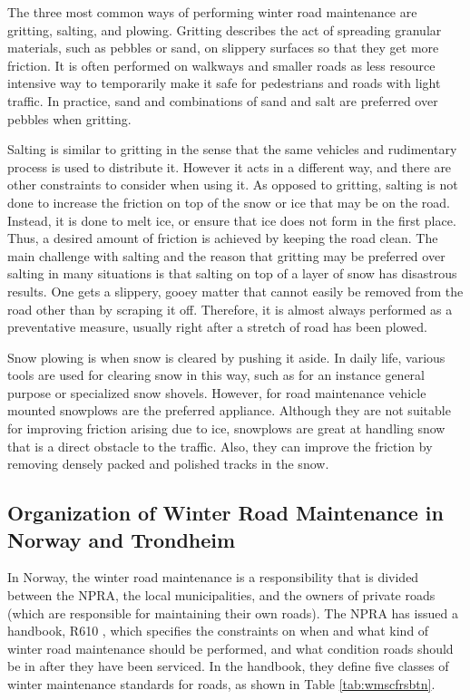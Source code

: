 The three most common ways of performing winter road maintenance are gritting, salting, and plowing. Gritting describes the act of spreading granular materials, such as pebbles or sand, on slippery surfaces so that they get more friction. It is often performed on walkways and smaller roads as less resource intensive way to temporarily make it safe for pedestrians and roads with light traffic. In practice, sand and combinations of sand and salt are preferred over pebbles when gritting.

Salting is similar to gritting in the sense that the same vehicles and rudimentary process is used to distribute it. However it acts in a different way, and there are other constraints to consider when using it. As opposed to gritting, salting is not done to increase the friction on top of the snow or ice that may be on the road. Instead, it is done to melt ice, or ensure that ice does not form in the first place. Thus, a desired amount of friction is achieved by keeping the road clean. The main challenge with salting and the reason that gritting may be preferred over salting in many situations is that salting on top of a layer of snow has disastrous results. One gets a slippery, gooey matter that cannot easily be removed from the road other than by scraping it off. Therefore, it is almost always performed as a preventative measure, usually right after a stretch of road has been plowed.

Snow plowing is when snow is cleared by pushing it aside. In daily life, various tools are used for clearing snow in this way, such as for an instance general purpose or specialized snow shovels. However, for road maintenance vehicle mounted snowplows are the preferred appliance. Although they are not suitable for improving friction arising due to ice, snowplows are great at handling snow that is a direct obstacle to the traffic. Also, they can improve the friction by removing densely packed and polished tracks in the snow.

\subsection{Organization of Winter Road Maintenance in Norway and Trondheim} %
\label{ssub:how_winter_road_maintenance_is_organized_in_norway_and_trondheim}


In Norway, the winter road maintenance is a responsibility that is divided between the NPRA, the local municipalities, and the owners of private roads (which are responsible for maintaining their own roads). The NPRA has issued a handbook, R610 \citep{svvR610}, which specifies the constraints on when and what kind of winter road maintenance should be performed, and what condition roads should be in after they have been serviced. In the handbook, they define five classes of winter maintenance standards for roads, as shown in Table \ref{tab:wmscfrsbtn}.

